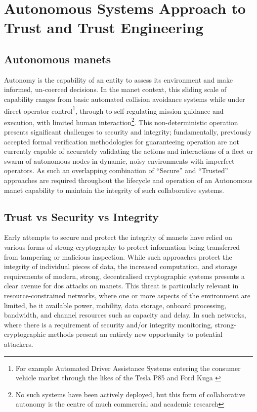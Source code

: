 \section{Autonomous Systems Approach to Trust and Trust Engineering}

\subsection{Autonomous \glspl{manet}}
Autonomy is the capability of an entity to assess its environment and make informed, un-coerced decisions.
In the \gls{manet} context, this sliding scale of capability ranges from basic automated collision avoidance systems while under direct operator control\footnote{For example Automated Driver Assistance Systems entering the consumer vehicle market through the likes of the Tesla P85 and Ford Kuga \cite{Sawade2016}}, through to self-regulating mission guidance and execution, with limited human interaction\footnote{No such systems have been actively deployed, but this form of collaborative autonomy is the centre of much commercial and academic research\cite{Rajesh2015,Autefage2015,Teke2015}}.
This non-deterministic operation presents significant challenges to security and integrity; fundamentally, previously accepted formal verification methodologies for guaranteeing operation are not currently capable of accurately validating the actions and interactions of a fleet or swarm of autonomous nodes in dynamic, noisy environments with imperfect operators\cite{Teke2015}. 
As such an overlapping combination of ``Secure'' and ``Trusted'' approaches are required throughout the lifecycle and operation of an Autonomous \gls{manet} capability to maintain the integrity of such collaborative systems.

\subsection{Trust vs Security vs Integrity}

Early attempts to secure and protect the integrity of \glspl{manet} have relied on various forms of strong-cryptography to protect information being transferred from tampering or malicious inspection.
While such approaches protect the integrity of individual pieces of data, the increased computation, and storage requirements of modern, strong, decentralised cryptographic systems presents a clear avenue for \gls{dos} attacks on \glspl{manet}.
This threat is particularly relevant in resource-constrained networks, where one or more aspects of the environment are limited, be it available power, mobility, data storage, onboard processing, bandwidth, and channel resources such as capacity and delay.
In such networks, where there is a requirement of security and/or integrity monitoring, strong-cryptographic methods present an entirely new opportunity to potential attackers.

